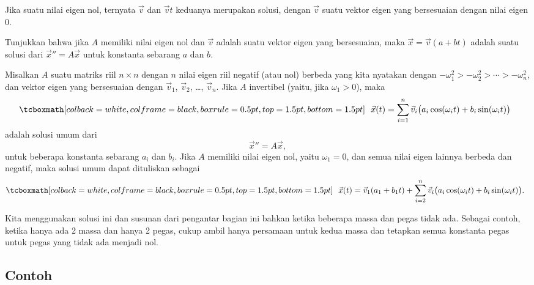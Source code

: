 Jika suatu nilai eigen nol, ternyata $\vec{v}$ dan $\vec{v} t$ keduanya merupakan
solusi, dengan $\vec{v}$ suatu vektor eigen yang bersesuaian dengan nilai eigen
0.

\begin{exercise}
Tunjukkan bahwa jika $A$ memiliki nilai eigen nol dan $\vec{v}$ adalah suatu
vektor eigen yang bersesuaian, maka $\vec{x} = \vec{v} (a + bt)$ adalah suatu solusi
dari ${\vec{x}}'' = A \vec{x}$ untuk
konstanta sebarang $a$ dan $b$.
\end{exercise}

\begin{theorem}
Misalkan $A$ suatu matriks riil $n \times n$
dengan $n$ nilai eigen riil negatif (atau nol) berbeda yang kita
nyatakan dengan $-\omega_1^2 > -\omega_2^2 > \cdots > -\omega_n^2$, dan
vektor eigen yang bersesuaian
dengan
$\vec{v}_1$, $\vec{v}_2$, \ldots, $\vec{v}_n$.  Jika $A$ invertibel
(yaitu, jika $\omega_1 > 0$), maka
\begin{equation*}
\mybxbg{~~
\vec{x}(t)
= \sum_{i=1}^n \vec{v}_i \bigl(a_i \cos (\omega_i t) + b_i \sin (\omega_i t) \bigr) 
~~}
\end{equation*}
adalah solusi umum dari
\begin{equation*}
{\vec{x}}'' = A \vec{x},
\end{equation*}
untuk beberapa konstanta sebarang $a_i$ dan $b_i$.
Jika $A$ memiliki nilai eigen nol, yaitu $\omega_1 = 0$,
dan semua nilai eigen lainnya berbeda dan
negatif, maka solusi umum dapat dituliskan sebagai
\begin{equation*}
\mybxbg{~~
\vec{x}(t) = \vec{v}_1 (a_1 + b_1 t) +
\sum_{i=2}^n \vec{v}_i \bigl(a_i \cos (\omega_i t) + b_i \sin (\omega_i t) \bigr) .
~~}
\end{equation*}
\end{theorem}

Kita menggunakan solusi ini dan susunan dari pengantar
bagian ini bahkan ketika beberapa massa dan pegas tidak ada.  
Sebagai contoh, ketika hanya ada 2 massa dan hanya 2 pegas, cukup ambil
hanya persamaan untuk
kedua massa dan tetapkan semua konstanta pegas untuk pegas yang
tidak ada menjadi nol.

\subsection{Contoh}

